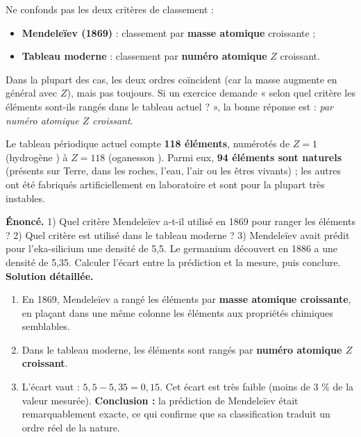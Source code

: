 \documentclass[11pt]{article}
\begin{document}
\begin{attention}
Ne confonds pas les deux critères de classement :
\begin{itemize}
\item \textbf{Mendeleïev (1869)} : classement par \textbf{masse atomique} croissante ;
\item \textbf{Tableau moderne} : classement par \textbf{numéro atomique} $Z$ croissant.
\end{itemize}
Dans la plupart des cas, les deux ordres coïncident (car la masse augmente en général avec $Z$), mais pas toujours. Si un exercice demande « selon quel critère les éléments sont-ils rangés dans le tableau actuel ? », la bonne réponse est : \emph{par numéro atomique $Z$ croissant}.
\end{attention}

\begin{propriete}
Le tableau périodique actuel compte \textbf{118 éléments}, numérotés de $Z = 1$ (hydrogène ) à $Z = 118$ (oganesson ). Parmi eux, \textbf{94 éléments sont naturels} (présents sur Terre, dans les roches, l'eau, l'air ou les êtres vivants) ; les autres ont été fabriqués artificiellement en laboratoire et sont pour la plupart très instables.
\end{propriete}

\begin{exoresolu}
\textbf{Énoncé.} 1) Quel critère Mendeleïev a-t-il utilisé en 1869 pour ranger les éléments ? 2) Quel critère est utilisé dans le tableau moderne ? 3) Mendeleïev avait prédit pour l'eka-silicium une densité de 5,5. Le germanium découvert en 1886 a une densité de 5,35. Calculer l'écart entre la prédiction et la mesure, puis conclure.
\tcblower
\textbf{Solution détaillée.}
\begin{enumerate}
\item En 1869, Mendeleïev a rangé les éléments par \textbf{masse atomique croissante}, en plaçant dans une même colonne les éléments aux propriétés chimiques semblables.
\item Dans le tableau moderne, les éléments sont rangés par \textbf{numéro atomique $Z$ croissant}.
\item L'écart vaut : $5,5 - 5,35 = 0,15$. Cet écart est très faible (moins de 3 \% de la valeur mesurée). \textbf{Conclusion :} la prédiction de Mendeleïev était remarquablement exacte, ce qui confirme que sa classification traduit un ordre réel de la nature.
\end{enumerate}
\end{exoresolu}
\end{document}

